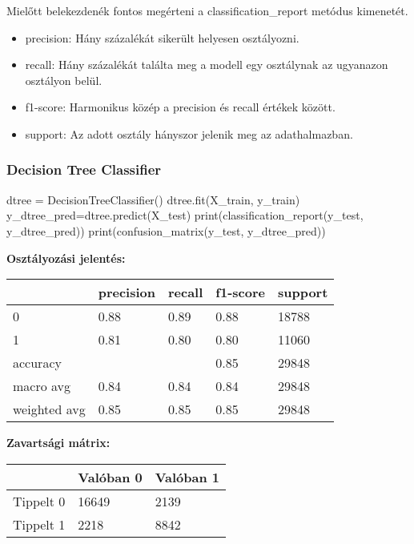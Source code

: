 Mielőtt belekezdenék fontos megérteni a classification\_report metódus kimenetét.
\begin{itemize}
    \item precision: Hány százalékát sikerült helyesen osztályozni.
    \item recall: Hány százalékát találta meg a modell egy osztálynak az ugyanazon osztályon belül.
    \item f1-score: Harmonikus közép a precision és recall értékek között.
    \item support: Az adott osztály hányszor jelenik meg az adathalmazban.
\end{itemize}

\subsubsection{Decision Tree Classifier}
\begin{python}
dtree = DecisionTreeClassifier()
dtree.fit(X_train, y_train)
y_dtree_pred=dtree.predict(X_test)
print(classification_report(y_test, y_dtree_pred))
print(confusion_matrix(y_test, y_dtree_pred))
\end{python}

\textbf{Osztályozási jelentés:}

\begin{tabular}{|l|l|l|l|l|}
            \hline
             & precision & recall & f1-score & support \\
             \hline
0            & 0.88      & 0.89   & 0.88     & 18788   \\
            \hline
1            & 0.81      & 0.80   & 0.80     & 11060   \\
            \hline
accuracy     &           &        & 0.85     & 29848   \\
            \hline
macro avg    & 0.84      & 0.84   & 0.84     & 29848   \\
            \hline
weighted avg & 0.85      & 0.85   & 0.85     & 29848   \\
            \hline
\end{tabular}

\textbf{Zavartsági mátrix:}

\begin{tabular}{|l|l|l|}
\hline
          & Valóban 0 & Valóban 1 \\
\hline
Tippelt 0 & 16649     & 2139      \\
\hline
Tippelt 1 & 2218      & 8842   \\
\hline
\end{tabular}


